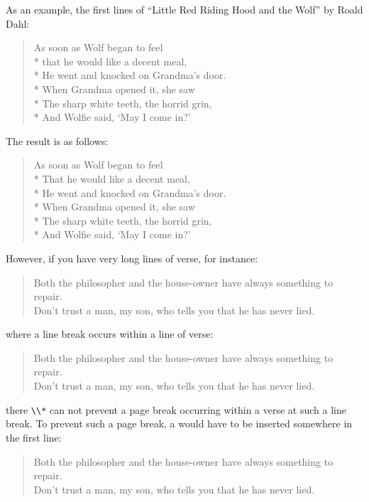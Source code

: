 \begin{Example}
  \label{desc:maincls.env.verse.example}%
  As an example, the first lines of ``Little Red Riding Hood and the
  Wolf'' by Roald Dahl:
\begin{lstcode}
  \begin{verse}
    As soon as Wolf began to feel\\*
    that he would like a decent meal,\\*
    He went and knocked on Grandma's door.\\*
    When Grandma opened it, she saw\\*
    The sharp white teeth, the horrid grin,\\*
    And Wolfie said, `May I come in?'
  \end{verse}
\end{lstcode}
  The result is as follows:
  \begin{ShowOutput}
  \begin{verse}
    As soon as Wolf began to feel\\*
    That he would like a decent meal,\\*
    He went and knocked on Grandma's door.\\*
    When Grandma opened it, she saw\\*
    The sharp white teeth, the horrid grin,\\*
    And Wolfie said, `May I come in?'
  \end{verse}
  \end{ShowOutput}
  However, if you have very long lines of verse, for instance:
\begin{lstcode}
  \begin{verse}
    Both the philosopher and the house-owner
    have always something to repair.\\
    \bigskip
    Don't trust a man, my son, who tells you
    that he has never lied.
  \end{verse}
\end{lstcode}
  where a line break occurs within a line of verse:
\begin{ShowOutput}
  \begin{verse}
    Both the philosopher and the house-owner
    have always something to repair.\\
    \bigskip
    Don't trust a man, my son, who tells you
    that he has never lied.
  \end{verse}
\end{ShowOutput}
  there \verb|\\*| can not prevent a page break occurring within a verse
  at such a line break. To prevent such a page break, a
   would have to be inserted
  somewhere in the first line:
\begin{lstcode}
  \begin{verse}
    Both the philosopher and the house-owner\nopagebreak
    have always something to repair.\\
    \bigskip
    Don't trust a man, my son, who tells you\nopagebreak
    that he has never lied.
  \end{verse}
\end{lstcode}


\end{Example}
